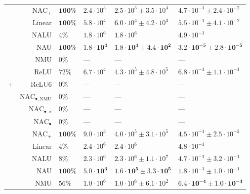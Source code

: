 \begin{longtable}{crllll}
 & $\mathrm{NAC}_{+}$ & $\mathbf{100\%}$ & $2.4 \cdot 10^{5}$ & $2.5 \cdot 10^{5} \pm 3.5 \cdot 10^{4}$ & $4.7 \cdot 10^{-1} \pm 2.4 \cdot 10^{-2}$\\

 & Linear & $\mathbf{100\%}$ & $5.8 \cdot 10^{4}$ & $6.0 \cdot 10^{4} \pm 4.2 \cdot 10^{3}$ & $5.5 \cdot 10^{-1} \pm 4.1 \cdot 10^{-2}$\\

 & NALU & $4\%$ & $1.8 \cdot 10^{6}$ & $1.8 \cdot 10^{6}$ & $4.9 \cdot 10^{-1}$\\

 & NAU & $\mathbf{100\%}$ & $\mathbf{1.8 \cdot 10^{4}}$ & $\mathbf{1.8 \cdot 10^{4} \pm 4.4 \cdot 10^{2}}$ & $\mathbf{3.2 \cdot 10^{-5} \pm 2.8 \cdot 10^{-5}}$\\

 & NMU & $0\%$ & --- & --- & ---\\

 & ReLU & $72\%$ & $6.7 \cdot 10^{4}$ & $4.3 \cdot 10^{5} \pm 4.8 \cdot 10^{5}$ & $6.8 \cdot 10^{-1} \pm 1.1 \cdot 10^{-1}$\\

\multirow{-10}{*}{\centering\arraybackslash $\bm{+}$} & ReLU6 & $0\%$ & --- & --- & ---\\
\cmidrule{1-6}
 & $\mathrm{NAC}_{\bullet,\mathrm{NMU}}$ & $0\%$ & --- & --- & ---\\

 & $\mathrm{NAC}_{\bullet,\sigma}$ & $0\%$ & --- & --- & ---\\

 & $\mathrm{NAC}_{\bullet}$ & $0\%$ & --- & --- & ---\\

 & $\mathrm{NAC}_{+}$ & $\mathbf{100\%}$ & $9.0 \cdot 10^{3}$ & $4.0 \cdot 10^{5} \pm 3.1 \cdot 10^{5}$ & $4.5 \cdot 10^{-1} \pm 2.5 \cdot 10^{-2}$\\

 & Linear & $4\%$ & $2.4 \cdot 10^{6}$ & $2.4 \cdot 10^{6}$ & $4.8 \cdot 10^{-1}$\\

 & NALU & $8\%$ & $2.3 \cdot 10^{6}$ & $2.3 \cdot 10^{6} \pm 1.1 \cdot 10^{7}$ & $4.7 \cdot 10^{-1} \pm 3.2 \cdot 10^{-1}$\\

 & NAU & $\mathbf{100\%}$ & $\mathbf{5.0 \cdot 10^{3}}$ & $\mathbf{1.6 \cdot 10^{5} \pm 3.3 \cdot 10^{5}}$ & $1.8 \cdot 10^{-1} \pm 1.0 \cdot 10^{-1}$\\

 & NMU & $56\%$ & $1.0 \cdot 10^{6}$ & $1.0 \cdot 10^{6} \pm 6.1 \cdot 10^{2}$ & $\mathbf{6.4 \cdot 10^{-4} \pm 1.0 \cdot 10^{-4}}$\\


\end{longtable}
